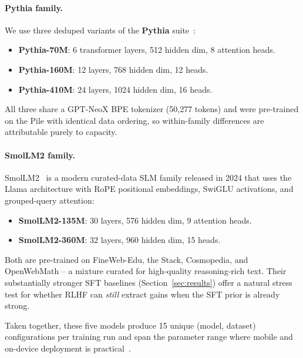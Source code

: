 \documentclass[10pt,twocolumn,letterpaper]{article}
\begin{document}
\paragraph{Pythia family.} We use three deduped variants of the \textbf{Pythia} suite~\cite{biderman2023pythia}:
\begin{itemize}[topsep=2pt, itemsep=1pt]
  \item \textbf{Pythia-70M}: 6 transformer layers, 512 hidden dim, 8 attention heads.
  \item \textbf{Pythia-160M}: 12 layers, 768 hidden dim, 12 heads.
  \item \textbf{Pythia-410M}: 24 layers, 1024 hidden dim, 16 heads.
\end{itemize}
All three share a GPT-NeoX BPE tokenizer (50,277 tokens) and were pre-trained on the Pile with identical data ordering, so within-family differences are attributable purely to capacity.

\paragraph{SmolLM2 family.} SmolLM2~\cite{allal2025smollm2} is a modern curated-data SLM family released in 2024 that uses the Llama architecture with RoPE positional embeddings, SwiGLU activations, and grouped-query attention:
\begin{itemize}[topsep=2pt, itemsep=1pt]
  \item \textbf{SmolLM2-135M}: 30 layers, 576 hidden dim, 9 attention heads.
  \item \textbf{SmolLM2-360M}: 32 layers, 960 hidden dim, 15 heads.
\end{itemize}
Both are pre-trained on FineWeb-Edu, the Stack, Cosmopedia, and OpenWebMath -- a mixture curated for high-quality reasoning-rich text. Their substantially stronger SFT baselines (Section~\ref{sec:results}) offer a natural stress test for whether RLHF can \emph{still} extract gains when the SFT prior is already strong.

Taken together, these five models produce 15 unique (model, dataset) configurations per training run and span the parameter range where mobile and on-device deployment is practical~\cite{liu2024mobilellm,mehta2024openelm,abdin2024phi3}.
\end{document}
